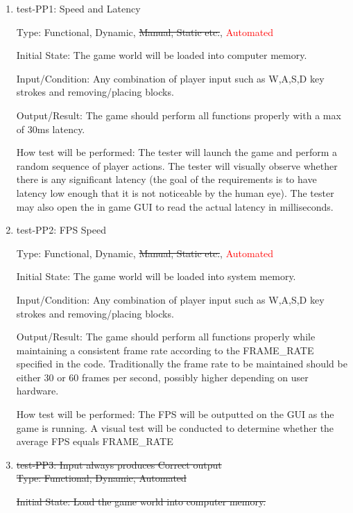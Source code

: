 \documentclass[12pt, titlepage]{article}
\begin{document}
\begin{enumerate}

\item{test-PP1: Speed and Latency\\}

Type: Functional, Dynamic, \sout{Manual, Static etc.}, \textcolor{red}{Automated}
					
Initial State: The game world will be loaded into computer memory.
					
Input/Condition: Any combination of player input such as W,A,S,D key strokes and removing/placing blocks.
					
Output/Result: The game should perform all functions properly with a max of 30ms latency.
					
How test will be performed: The tester will launch the game and perform a random sequence of player actions. The tester will visually observe whether there is any significant latency (the goal of the requirements is to have latency low enough that it is not noticeable by the human eye). The tester may also open the in game GUI to read the actual latency in milliseconds.

\item{test-PP2: FPS Speed\\}

Type: Functional, Dynamic, \sout{Manual, Static etc.}, \textcolor{red}{Automated}
					
Initial State: The game world will be loaded into system memory.
					
Input/Condition: Any combination of player input such as W,A,S,D key strokes and removing/placing blocks.
					
Output/Result: The game should perform all functions properly while maintaining a consistent frame rate according to the FRAME\_RATE specified in the code. Traditionally the frame rate to be maintained should be either 30 or 60 frames per second, possibly higher depending on user hardware.
					
How test will be performed: The FPS will be outputted on the GUI as the game is running. A visual test will be conducted to determine whether the average FPS equals FRAME\_RATE

\item{\sout{test-PP3: Input always produces Correct output}}\\

\sout{Type: Functional, Dynamic, Automated}
					
\sout{Initial State: Load the game world into computer memory.}
					

\end{enumerate}
\end{document}

